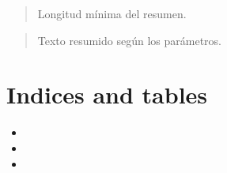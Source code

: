 \documentclass[letterpaper,10pt,english]{sphinxmanual}
\begin{document}
\begin{fulllineitems}
\begin{fulllineitems}
\begin{description}
\begin{quote}
\begin{description}
\sphinxAtStartPar
Longitud mínima del resumen.

\end{description}\end{quote}

\begin{quote}\begin{description}
\sphinxAtStartPar
Texto resumido según los parámetros.

\end{description}\end{quote}

\end{description}

\end{fulllineitems}


\end{fulllineitems}



\chapter{Indices and tables}
\label{\detokenize{index:indices-and-tables}}\begin{itemize}
\item {} 
\sphinxAtStartPar
{}

\item {} 
\sphinxAtStartPar
{}

\item {} 
\sphinxAtStartPar
{}

\end{itemize}


\renewcommand{\indexname}{Python Module Index}
\begin{sphinxtheindex}
\let\bigletter\sphinxstyleindexlettergroup
\bigletter{s}
\item\relax{}
\end{sphinxtheindex}

\renewcommand{\indexname}{Index}
\printindex
\end{document}
